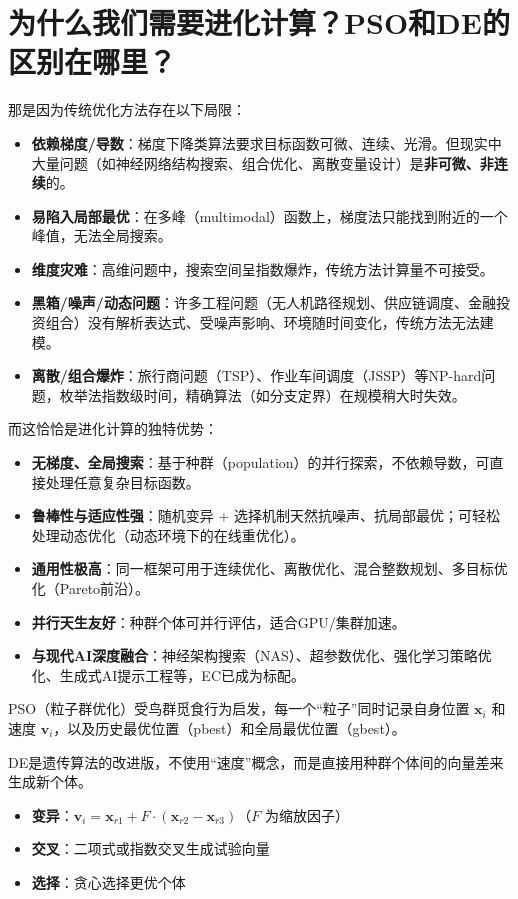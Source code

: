 \documentclass[12pt,a4paper,UTF8]{ctexart}
\begin{document}
\section{为什么我们需要进化计算？PSO和DE的区别在哪里？}

那是因为传统优化方法存在以下局限：
\begin{itemize}
    \item \textbf{依赖梯度/导数}：梯度下降类算法要求目标函数可微、连续、光滑。但现实中大量问题（如神经网络结构搜索、组合优化、离散变量设计）是\textbf{非可微、非连续}的。
    \item \textbf{易陷入局部最优}：在多峰（multimodal）函数上，梯度法只能找到附近的一个峰值，无法全局搜索。
    \item \textbf{维度灾难}：高维问题中，搜索空间呈指数爆炸，传统方法计算量不可接受。
    \item \textbf{黑箱/噪声/动态问题}：许多工程问题（无人机路径规划、供应链调度、金融投资组合）没有解析表达式、受噪声影响、环境随时间变化，传统方法无法建模。
    \item \textbf{离散/组合爆炸}：旅行商问题（TSP）、作业车间调度（JSSP）等NP-hard问题，枚举法指数级时间，精确算法（如分支定界）在规模稍大时失效。
\end{itemize}
而这恰恰是进化计算的独特优势：
\begin{itemize}
    \item \textbf{无梯度、全局搜索}：基于种群（population）的并行探索，不依赖导数，可直接处理任意复杂目标函数。
    \item \textbf{鲁棒性与适应性强}：随机变异 + 选择机制天然抗噪声、抗局部最优；可轻松处理动态优化（动态环境下的在线重优化）。
    \item \textbf{通用性极高}：同一框架可用于连续优化、离散优化、混合整数规划、多目标优化（Pareto前沿）。
    \item \textbf{并行天生友好}：种群个体可并行评估，适合GPU/集群加速。
    \item \textbf{与现代AI深度融合}：神经架构搜索（NAS）、超参数优化、强化学习策略优化、生成式AI提示工程等，EC已成为标配。
\end{itemize}
PSO（粒子群优化）受鸟群觅食行为启发，每一个“粒子”同时记录自身位置 \( \mathbf{x}_i \) 和速度 \( \mathbf{v}_i \)，以及历史最优位置（pbest）和全局最优位置（gbest）。

DE是遗传算法的改进版，不使用“速度”概念，而是直接用种群个体间的向量差来生成新个体。
\begin{itemize}
    \item \textbf{变异}：\( \mathbf{v}_i = \mathbf{x}_{r1} + F \cdot (\mathbf{x}_{r2} - \mathbf{x}_{r3}) \)（\( F \) 为缩放因子）
    \item \textbf{交叉}：二项式或指数交叉生成试验向量
    \item \textbf{选择}：贪心选择更优个体
\end{itemize}
\end{document}
